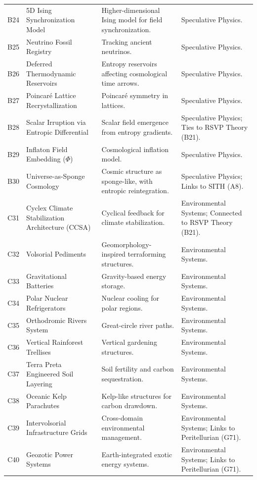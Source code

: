\documentclass[11pt,oneside]{memoir}
\theoremstyle{plain}
\begin{document}
\begin{longtable}{|p{1.5cm}|p{3.5cm}|p{6cm}|p{4cm}|}
B24 & 5D Ising Synchronization Model & Higher-dimensional Ising model for field synchronization. & Speculative Physics. \\
B25 & Neutrino Fossil Registry & Tracking ancient neutrinos. & Speculative Physics. \\
B26 & Deferred Thermodynamic Reservoirs & Entropy reservoirs affecting cosmological time arrows. & Speculative Physics. \\
B27 & Poincaré Lattice Recrystallization & Poincaré symmetry in lattices. & Speculative Physics. \\
B28 & Scalar Irruption via Entropic Differential & Scalar field emergence from entropy gradients. & Speculative Physics; Ties to RSVP Theory (B21). \\
B29 & Inflaton Field Embedding (\(\Phi\)) & Cosmological inflation model. & Speculative Physics. \\
B30 & Universe-as-Sponge Cosmology & Cosmic structure as sponge-like, with entropic reintegration. & Speculative Physics; Links to SITH (A8). \\
C31 & Cyclex Climate Stabilization Architecture (CCSA) & Cyclical feedback for climate stabilization. & Environmental Systems; Connected to RSVP Theory (B21). \\
C32 & Volsorial Pediments & Geomorphology-inspired terraforming structures. & Environmental Systems. \\
C33 & Gravitational Batteries & Gravity-based energy storage. & Environmental Systems. \\
C34 & Polar Nuclear Refrigerators & Nuclear cooling for polar regions. & Environmental Systems. \\
C35 & Orthodromic Rivers System & Great-circle river paths. & Environmental Systems. \\
C36 & Vertical Rainforest Trellises & Vertical gardening structures. & Environmental Systems. \\
C37 & Terra Preta Engineered Soil Layering & Soil fertility and carbon sequestration. & Environmental Systems. \\
C38 & Oceanic Kelp Parachutes & Kelp-like structures for carbon drawdown. & Environmental Systems. \\
C39 & Intervolsorial Infrastructure Grids & Cross-domain environmental management. & Environmental Systems; Links to Peritellurian (G71). \\
C40 & Geozotic Power Systems & Earth-integrated exotic energy systems. & Environmental Systems; Links to Peritellurian (G71). \\

\end{longtable}
\end{document}

